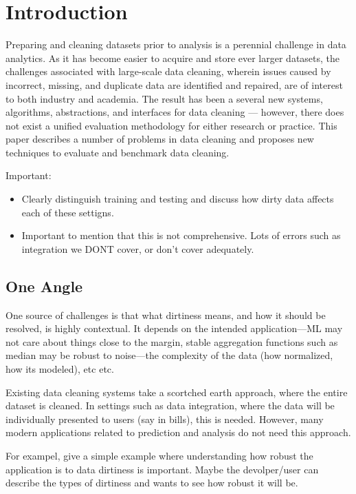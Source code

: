 \section{Introduction}
Preparing and cleaning datasets prior to analysis is a perennial challenge in data analytics. As it has become easier to acquire and store ever larger datasets, the challenges associated with large-scale data cleaning, wherein issues caused by incorrect, missing, and duplicate data are identified and repaired, are of interest to both industry and academia. The result has been a several new systems, algorithms, abstractions, and interfaces for data cleaning --- however, there does not exist a unified evaluation methodology for either research or practice. This paper describes a number of problems in data cleaning and proposes new techniques to evaluate and benchmark data cleaning.


Important:

\begin{itemize}
\item Clearly distinguish training and testing and discuss how dirty data affects each of these settigns.
\item Important to mention that this is not comprehensive.  Lots of errors such as integration we DONT cover, or don't cover adequately.
\end{itemize}


\subsection{One Angle}

One source of challenges is that what dirtiness means, and how it should be resolved, is highly contextual.  It depends on the intended application---ML may not care about things close to the margin, stable aggregation functions such as median may be robust to noise---the complexity of the data (how normalized, how its modeled), etc etc.

Existing data cleaning systems take a scortched earth approach, where the entire dataset is cleaned.  In settings such as data integration, where the data will be individually presented to users (say in bills), this is needed.  However, many modern applications related to prediction and analysis do not need this approach. 

For exampel, give a simple example where understanding how robust the application is to data dirtiness is important.  Maybe the devolper/user can describe the types of dirtiness and wants to see how robust it will be.  


